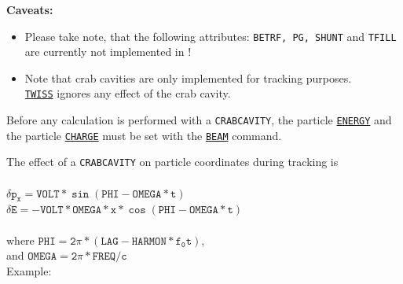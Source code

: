 \textbf{Caveats:}
\begin{itemize}
   \item Please take note, that the following \madeight attributes:
     \texttt{BETRF, PG, SHUNT} and \texttt{TFILL} are currently not
     implemented in \madx!
   \item Note that crab cavities are only implemented for
     tracking  purposes. \\ \hyperref[chap:twiss]{\texttt{TWISS}} ignores any effect 
     of the crab cavity.  
\end{itemize} 


Before any calculation is performed with a \texttt{CRABCAVITY}, the particle
\hyperref[sec:beam]{\texttt{ENERGY}} and the particle
\hyperref[sec:beam]{\texttt{CHARGE}} must be set with the
\hyperref[sec:beam]{\texttt{BEAM}} command.

The effect of a \texttt{CRABCAVITY} on particle coordinates during tracking is
\\
\\ $\mathtt{\delta p_x  = VOLT * \sin(PHI - OMEGA * t)}$ 
\\ $\mathtt{\delta E  = - VOLT * OMEGA * x * \cos (PHI - OMEGA * t)}$ 
\\ 
\\ where $\mathtt{PHI =  2\pi * (LAG - HARMON * f_0 t)}$, 
\\ and $\mathtt{OMEGA = 2\pi * FREQ / c}$
\\


Example: 

